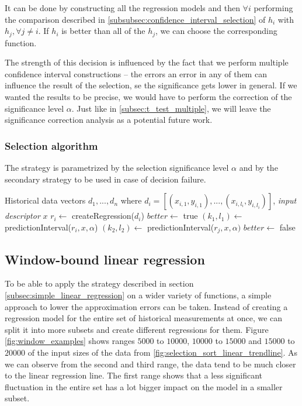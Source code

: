 It can be done by constructing all the regression models and then $\forall i$ performing the comparison described in \ref{subsubsec:confidence_interval_selection} of $h_i$ with $h_j, \forall j \ne i$. If $h_i$ is better than all of the $h_j$, we can choose the corresponding function.

The strength of this decision is influenced by the fact that we perform multiple confidence interval constructions -- the errors an error in any of them can influence the result of the selection, se the significance gets lower in general. If we wanted the results to be precise, we would have to perform the correction of the significance level $\alpha$. Just like in \ref{subsec:t_test_multiple}, we will leave the significance correction analysis as a potential future work.

\subsubsection{Selection algorithm}

The strategy is parametrized by the selection significance level $\alpha$ and by the secondary strategy to be used in case of decision failure.

\begin{algorithmic}[1] %
	\INPUT Historical data vectors $d_1,...,d_n$ where $d_i = [(x_{i,1}, y_{i,1}),...,(x_{i,l_i}, y_{i,l_i})]$, \textit{input descriptor} $x$
	\State $r_i \gets$ createRegression($d_i$) 
	\EndFor
	\State $better \gets$ true
	\State $(k_1, l_1) \gets$ predictionInterval($r_i, x, \alpha$)
	\State $(k_2, l_2) \gets$ predictionInterval($r_j, x, \alpha)$
	\State $better \gets$ false
	\EndIf
	\EndFor
	\State {}
	\EndIf
	\EndFor
	\State {}
\end{algorithmic}

\subsection{Window-bound linear regression}
\label{subsec:window_bound_regression}

To be able to apply the strategy described in section \ref{subsec:simple_linear_regression} on a wider variety of functions, a simple approach to lower the approximation errors can be taken. Instead of creating a regression model for the entire set of historical measurements at once, we can split it into more subsets and create different regressions for them. Figure \ref{fig:window_examples} shows ranges $5000$ to $10000$, $10000$ to $15000$ and $15000$ to $20000$ of the input sizes of the data from \ref{fig:selection_sort_linear_trendline}. As we can observe from the second and third range, the data tend to be much closer to the linear regression line. The first range shows that a less significant fluctuation in the entire set has a lot bigger impact on the model in a smaller subset.

